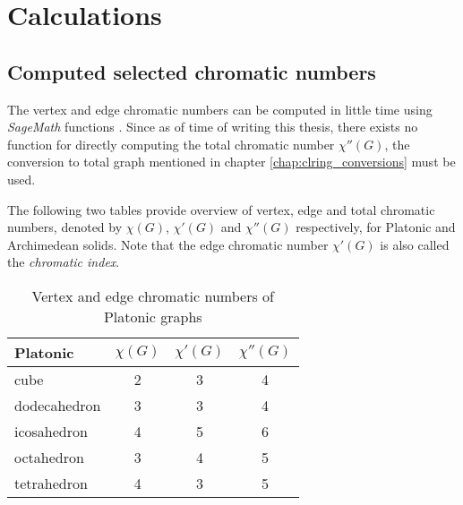 \chapter{Calculations}

\section{Computed selected chromatic numbers}

The vertex and edge chromatic numbers can be computed in little time using \textit{SageMath} functions \cite{sagemath-chromatic-number} \cite{sagemath-chromatic-index}. Since as of time of writing this thesis, there exists no function for directly computing the total chromatic number $\chi''(G)$, the conversion to total graph mentioned in chapter \ref{chap:clring_conversions} must be used. 

The following two tables provide overview of vertex, edge and total chromatic numbers, denoted by $\chi(G)$, $\chi'(G)$ and $\chi''(G)$ respectively, for Platonic and Archimedean solids. Note that the edge chromatic number $\chi'(G)$ is also called the \textit{chromatic index}.

\begin{table}[H]
\centering
\caption{Vertex and edge chromatic numbers of Platonic graphs}
\vspace{5pt}
\label{tab:platonic-chrom-nums}
\begin{tabular}{|l|c|c|c|}
\hline
Platonic & $\chi(G)$ & $\chi'(G)$ & $\chi''(G)$ \\
\hline\hline
cube & 2 & 3 & 4 \\
\hline
dodecahedron & 3 & 3 & 4 \\
\hline
icosahedron & 4 & 5 & 6 \\
\hline
octahedron & 3 & 4 & 5 \\
\hline
tetrahedron & 4 & 3 & 5 \\
\hline
\end{tabular}
\end{table}

